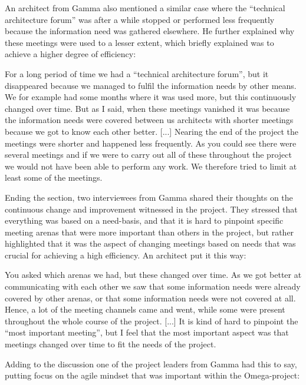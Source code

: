 An architect from Gamma also mentioned a similar case where the ``technical architecture forum'' was after a while stopped or performed less frequently because the information need was gathered elsewhere. He further explained why these meetings were used to a lesser extent, which briefly explained was to achieve a higher degree of efficiency:

\begin{fancyquotes}
For a long period of time we had a ``technical architecture forum'', but it disappeared because we managed to fulfil the information needs by other means. We for example had some months where it was used more, but this continuously changed over time. But as I said, when these meetings vanished it was because the information needs were covered between us architects with shorter meetings because we got to know each other better. [...] Nearing the end of the project the meetings were shorter and happened less frequently. As you could see there were several meetings and if we were to carry out all of these throughout the project we would not have been able to perform any work. We therefore tried to limit at least some of the meetings.
\end{fancyquotes}

Ending the section, two interviewees from Gamma shared their thoughts on the continuous change and improvement witnessed in the project. They stressed that everything was based on a need-basis, and that it is hard to pinpoint specific meeting arenas that were more important than others in the project, but rather highlighted that it was the aspect of changing meetings based on needs that was crucial for achieving a high efficiency. An architect put it this way:

\begin{fancyquotes}
You asked which arenas we had, but these changed over time. As we got better at communicating with each other we saw that some information needs were already covered by other arenas, or that some information needs were not covered at all. Hence, a lot of the meeting channels came and went, while some were present throughout the whole course of the project. [...] It is kind of hard to pinpoint the ``most important meeting'', but I feel that the most important aspect was that meetings changed over time to fit the needs of the project.
\end{fancyquotes}

Adding to the discussion one of the project leaders from Gamma had this to say, putting focus on the agile mindset that was important within the Omega-project:

